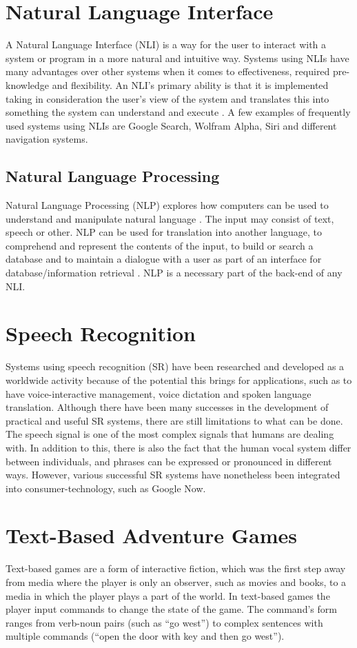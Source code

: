 \section{Natural Language Interface}
A Natural Language Interface (NLI) is a way for the user to interact with a system or program in a more natural and intuitive way. Systems using NLIs have many advantages over other systems when it comes to effectiveness, required pre-knowledge and flexibility. An NLI's primary ability is that it is implemented taking in consideration the user's view of the system and translates this into something the system can understand and execute \citep{Hend}. A few examples of frequently used systems using NLIs are Google Search, Wolfram Alpha, Siri and different navigation systems.

\subsection{Natural Language Processing}
Natural Language Processing (NLP) explores how computers can be used to understand and manipulate natural language \citep{Gobi}. The input may consist of text, speech or other. NLP can be used for translation into another language, to comprehend and represent the contents of the input, to build or search a database and to maintain a dialogue with a user as part of an interface for database/information retrieval \citep{Allen}. NLP is a necessary part of the back-end of any NLI.

\section{Speech Recognition}
Systems using speech recognition (SR) have been researched and developed as a worldwide activity because of the potential this brings for applications, such as to have voice-interactive management, voice dictation and spoken language translation. Although there have been many successes in the development of practical and useful SR systems, there are still limitations to what can be done. The speech signal is one of the most complex signals that humans are dealing with. In addition to this, there is also the fact that the human vocal system differ between individuals, and phrases can be expressed or pronounced in different ways. However, various successful SR systems have nonetheless been integrated into consumer-technology, such as Google Now. \citep[page 2]{SR}

\section{Text-Based Adventure Games}
Text-based games are a form of interactive fiction, which was the first step away from media where the player is only an observer, such as movies and books, to a media in which the player plays a part of the world. In text-based games the player input commands to change the state of the game. The command's form ranges from verb-noun pairs (such as ``go west'') to complex sentences with multiple commands (``open the door with key and then go west'').\citep[page 54-55]{Sweet}

